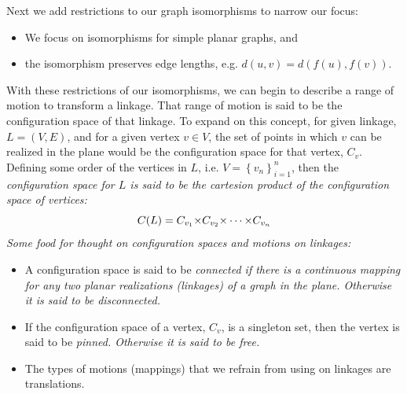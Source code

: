 Next we add restrictions to our graph isomorphisms to narrow our focus:
\begin{itemize}
\item[\rn{1}] We focus on isomorphisms for simple planar graphs, and
\item[\rn{2}] the isomorphism preserves edge lengths, e.g. $d(u,v) = d(f(u),f(v))$.
\end{itemize}  
With these restrictions of our isomorphisms, we can begin to describe a range of motion to transform a linkage.  That range of motion is said to be the configuration space of that linkage.  To expand on this concept, for given linkage, $L=(V,E)$, and for a given vertex $v \in V$, the set of points in which $v$ can be realized in the plane would be the configuration space for that vertex, $C_v$.  Defining some order of the vertices in $L$, i.e. $V = \left\lbrace v_n \right\rbrace_{i=1}^n$, then the \it{configuration space} for $L$ is said to be the cartesion product of the configuration space of vertices:
\begin{equation}\label{eqn:linkages-1}
C(L) = C_{v_1} {\times} C_{v_2} {\times} \cdots {\times} C_{v_n}
\end{equation} 
Some food for thought on configuration spaces and motions on linkages:
\begin{itemize}
\item[\rn{1}] A configuration space is said to be \it{connected} if there is a continuous mapping for any two planar realizations (linkages) of a graph in the plane.  Otherwise it is said to be \it{disconnected}.
\item[\rn{2}] If the configuration space of a vertex, $C_v$, is a singleton set, then the vertex is said to be \it{pinned}. Otherwise it is said to be \it{free}.
\item[\rn{3}] The types of motions (mappings) that we refrain from using on linkages are translations.
\end{itemize} 
